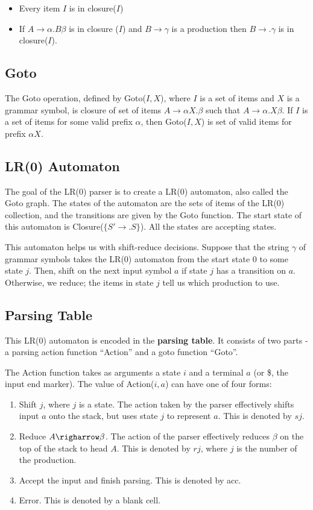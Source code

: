 \documentclass[12pt,letterpaper]{amsbook}
\theoremstyle{definition}
\begin{document}
\begin{itemize}
  \item Every item $I$ is in closure($I$)
  \item If $A \rightarrow \alpha . B \beta$ is in closure ($I$) and $B \rightarrow \gamma$ is a production then $B \rightarrow .\gamma$ is in closure($I$).
\end{itemize}

\subsection{Goto}

The Goto operation, defined by Goto($I,X$), where $I$ is a set of items and $X$ is a grammar symbol, is closure of set of items $A \rightarrow \alpha X. \beta$ such that $A \rightarrow \alpha . X \beta$. If $I$ is a set of items for some valid prefix $\alpha$, then Goto($I,X$) is set of valid items for prefix $\alpha X$. 

\subsection{LR(0) Automaton}

The goal of the LR(0) parser is to create a LR(0) automaton, also called the Goto graph. The states of the automaton are the sets of items of the LR(0) collection, and the transitions are given by the Goto function. The start state of this automaton is Closure($\{S' \rightarrow .S\}$). All the states are accepting states.

This automaton helps us with shift-reduce decisions. Suppose that the string $\gamma$ of grammar symbols takes the LR(0) automaton from the start state 0 to some state $j$. Then, shift on the next input symbol $a$ if state $j$ has a transition on $a$. Otherwise, we reduce; the items in state $j$ tell us which production to use.

\subsection{Parsing Table}

This LR(0) automaton is encoded in the \textbf{parsing table}. It consists of two parts - a parsing action function ``Action'' and a goto function ``Goto''.

The Action function takes as arguments a state $i$ and a terminal $a$ (or \$, the input end marker). The value of Action($i,a$) can have one of four forms:
\begin{enumerate}
  \item Shift $j$, where $j$ is a state. The action taken by the parser effectively shifts input $a$ onto the stack, but uses state $j$ to represent $a$. This is denoted by $sj$.
  \item Reduce $A \righarrow \beta$. The action of the parser effectively reduces $\beta$ on the top of the stack to head $A$. This is denoted by $rj$, where $j$ is the number of the production.
  \item Accept the input and finish parsing. This is denoted by acc.
  \item Error. This is denoted by a blank cell.
\end{enumerate}
\end{document}
